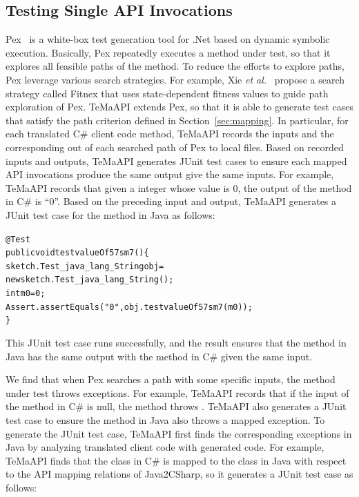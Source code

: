\subsection{Testing Single API Invocations}
\label{sec:approach:single}

Pex~\cite{tillmann2008pex} is a white-box test generation tool for .Net based on dynamic symbolic execution. Basically, Pex repeatedly executes a method under test, so that it explores all feasible paths of the method. To reduce the efforts to explore paths, Pex leverage various search strategies. For example, Xie \emph{et al.}~\cite{xie09:fitness} propose a search strategy called Fitnex that uses state-dependent fitness values to guide path exploration of Pex. TeMaAPI extends Pex, so that it is able to generate test cases that satisfy the path criterion defined in Section~\ref{sec:mapping}. In particular, for each translated C\# client code method, TeMaAPI records the inputs and the corresponding out of each searched path of Pex to local files. Based on recorded inputs and outputs, TeMaAPI generates JUnit test cases to ensure each mapped API invocations produce the same output give the same inputs.
For example, TeMaAPI records that given a integer whose value is 0, the output of the  method in C\# is ``0''. Based on the preceding input and output, TeMaAPI generates a JUnit test case for the  method in Java as follows:

\begin{CodeOut}%
\begin{alltt}
@Test
public void testvalueOf57sm7()\{
  sketch.Test_java_lang_String obj =
      new sketch.Test_java_lang_String();
  int m0 = 0;
  Assert.assertEquals("0", obj.testvalueOf57sm7(m0));
\}
\end{alltt}
\end{CodeOut}

This JUnit test case runs successfully, and the result ensures that the  method in Java has the same output with the  method in C\# given the same input.


We find that when Pex searches a path with some specific inputs, the method under test throws exceptions.
For example, TeMaAPI records that if the input of the  method in C\# is null, the method throws . TeMaAPI also generates a JUnit test case to ensure the  method in Java also throws a mapped exception. To generate the JUnit test case, TeMaAPI first finds the corresponding exceptions in Java by analyzing translated client code with generated code. For example, TeMaAPI finds that the  class in C\# is mapped to the  class in Java with respect to the API mapping relations of Java2CSharp, so it generates a JUnit test case as follows:

